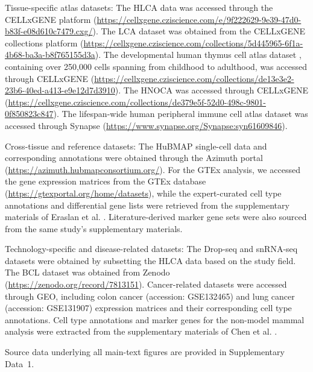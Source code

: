 \documentclass[pdflatex,sn-nature]{sn-jnl}%
\theoremstyle{thmstyleone}%
\theoremstyle{thmstyletwo}%
\theoremstyle{thmstylethree}%
\begin{document}
Tissue-specific atlas datasets:
The HLCA data was accessed through the CELLxGENE platform (\url{https://cellxgene.cziscience.com/e/9f222629-9e39-47d0-b83f-e08d610c7479.cxg/})\cite{sikkemaIntegratedCellAtlas2023}.
The LCA dataset was obtained from the CELLxGENE collections platform (\url{https://cellxgene.cziscience.com/collections/5d445965-6f1a-4b68-ba3a-b8f765155d3a}).
The developmental human thymus cell atlas dataset \cite{doi:10.1126/science.aay3224}, containing over 250,000 cells spanning from childhood to adulthood, was accessed through CELLxGENE (\url{https://cellxgene.cziscience.com/collections/de13e3e2-23b6-40ed-a413-e9e12d7d3910}).
The HNOCA \cite{IntegratedTranscriptomicCell} was accessed through CELLxGENE (\url{https://cellxgene.cziscience.com/collections/de379e5f-52d0-498c-9801-0f850823c847}).
The lifespan-wide human peripheral immune cell atlas dataset \cite{wangIntegratingSinglecellRNA2025} was accessed through Synapse (\url{https://www.synapse.org/Synapse:syn61609846}).

Cross-tissue and reference datasets:
The HuBMAP single-cell data and corresponding annotations were obtained through the Azimuth portal (\url{https://azimuth.hubmapconsortium.org/}).
For the GTEx analysis, we accessed the gene expression matrices from the GTEx database (\url{https://gtexportal.org/home/datasets}), while the expert-curated cell type annotations and differential gene lists were retrieved from the supplementary materials of Eraslan et al. \cite{eraslanSinglenucleusCrosstissueMolecular2022}. Literature-derived marker gene sets were also sourced from the same study's supplementary materials.

Technology-specific and disease-related datasets:
The Drop-seq \cite{strunzAlveolarRegenerationKrt82020} and snRNA-seq \cite{wangSinglecellMultiomicProfiling2020a} datasets were obtained by subsetting the HLCA data based on the study field.
The BCL dataset was obtained from Zenodo (\url{https://zenodo.org/record/7813151}).
Cancer-related datasets were accessed through GEO, including colon cancer (accession: GSE132465) and lung cancer (accession: GSE131907) expression matrices and their corresponding cell type annotations.
Cell type annotations and marker genes for the non-model mammal analysis were extracted from the supplementary materials of Chen et al. \cite{chenSingleCellAtlas2021}.

Source data underlying all main-text figures are provided in Supplementary Data~1.
\end{document}
